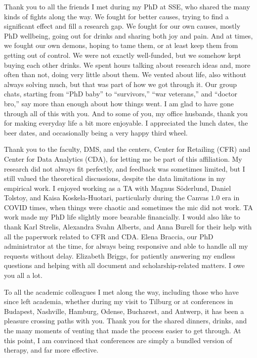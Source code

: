 Thank you to all the friends I met during my PhD at SSE, who shared the many kinds of fights along the way. We fought for better causes, trying to find a significant effect and fill a research gap. We fought for our own causes, mostly PhD wellbeing, going out for drinks and sharing both joy and pain. And at times, we fought our own demons, hoping to tame them, or at least keep them from getting out of control. We were not exactly well-funded, but we somehow kept buying each other drinks. We spent hours talking about research ideas and, more often than not, doing very little about them. We vented about life, also without always solving much, but that was part of how we got through it. Our group chats, starting from “PhD baby” to “survivors,” “war veterans,” and “doctor bro,” say more than enough about how things went. I am glad to have gone through all of this with you. And to some of you, my office husbands, thank you for making everyday life a bit more enjoyable. I appreciated the lunch dates, the beer dates, and occasionally being a very happy third wheel.

Thank you to the faculty, DMS, and the centers, Center for Retailing (CFR) and Center for Data Analytics (CDA), for letting me be part of this affiliation. My research did not always fit perfectly, and feedback was sometimes limited, but I still valued the theoretical discussions, despite the data limitations in my empirical work. I enjoyed working as a TA with Magnus Söderlund, Daniel Tolstoy, and Kaisa Koskela-Huotari, particularly during the Canvas $1.0$ era in COVID times, when things were chaotic and sometimes the mic did not work. TA work made my PhD life slightly more bearable financially. I would also like to thank Karl Strelis, Alexandra Svahn Alberts, and Anna Burell for their help with all the paperwork related to CFR and CDA. Elena Braccia, our PhD administrator at the time, for always being responsive and able to handle all my requests without delay. Elizabeth Briggs, for patiently answering my endless questions and helping with all document and scholarship-related matters. I owe you all a lot.


To all the academic colleagues I met along the way, including those who have since left academia, whether during my visit to Tilburg or at conferences in Budapest, Nashville, Hamburg, Odense, Bucharest, and Antwerp, it has been a pleasure crossing paths with you. Thank you for the shared dinners, drinks, and the many moments of venting that made the process easier to get through. At this point, I am convinced that conferences are simply a bundled version of therapy, and far more effective. 

